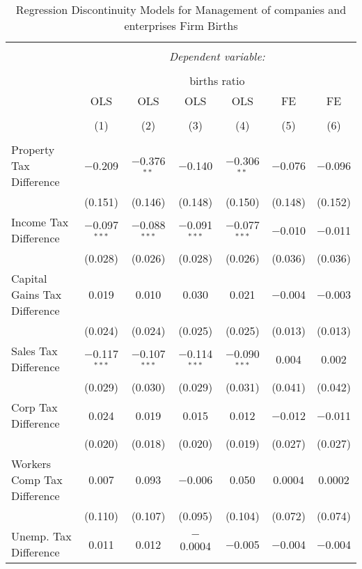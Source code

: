 
\begin{table}[!htbp] \centering 
  \caption{Regression Discontinuity Models for  Management of companies and enterprises Firm Births} 
  \label{55rd} 
\footnotesize 
\begin{tabular}{@{\extracolsep{5pt}}lcccccc} 
\\[-1.8ex]\hline 
\hline \\[-1.8ex] 
 & \multicolumn{6}{c}{\textit{Dependent variable:}} \\ 
\cline{2-7} 
\\[-1.8ex] & \multicolumn{6}{c}{births ratio} \\ 
 & OLS & OLS & OLS & OLS & FE & FE \\ 
\\[-1.8ex] & (1) & (2) & (3) & (4) & (5) & (6)\\ 
\hline \\[-1.8ex] 
 Property Tax Difference & $-$0.209 & $-$0.376$^{**}$ & $-$0.140 & $-$0.306$^{**}$ & $-$0.076 & $-$0.096 \\ 
  & (0.151) & (0.146) & (0.148) & (0.150) & (0.148) & (0.152) \\ 
  Income Tax Difference & $-$0.097$^{***}$ & $-$0.088$^{***}$ & $-$0.091$^{***}$ & $-$0.077$^{***}$ & $-$0.010 & $-$0.011 \\ 
  & (0.028) & (0.026) & (0.028) & (0.026) & (0.036) & (0.036) \\ 
  Capital Gains Tax Difference & 0.019 & 0.010 & 0.030 & 0.021 & $-$0.004 & $-$0.003 \\ 
  & (0.024) & (0.024) & (0.025) & (0.025) & (0.013) & (0.013) \\ 
  Sales Tax Difference & $-$0.117$^{***}$ & $-$0.107$^{***}$ & $-$0.114$^{***}$ & $-$0.090$^{***}$ & 0.004 & 0.002 \\ 
  & (0.029) & (0.030) & (0.029) & (0.031) & (0.041) & (0.042) \\ 
  Corp Tax Difference & 0.024 & 0.019 & 0.015 & 0.012 & $-$0.012 & $-$0.011 \\ 
  & (0.020) & (0.018) & (0.020) & (0.019) & (0.027) & (0.027) \\ 
  Workers Comp Tax Difference & 0.007 & 0.093 & $-$0.006 & 0.050 & 0.0004 & 0.0002 \\ 
  & (0.110) & (0.107) & (0.095) & (0.104) & (0.072) & (0.074) \\ 
  Unemp. Tax Difference & 0.011 & 0.012 & $-$0.0004 & $-$0.005 & $-$0.004 & $-$0.004 \\ 

\end{tabular}
\end{table}
